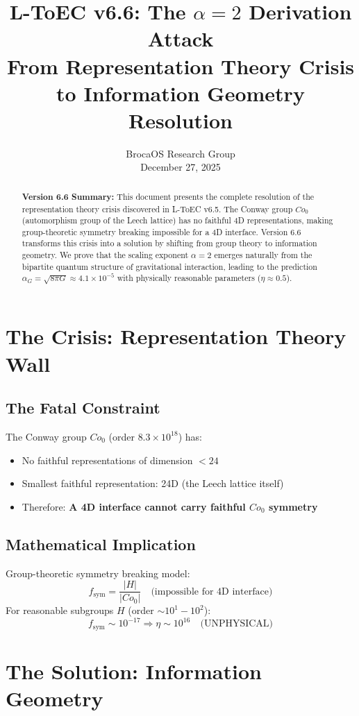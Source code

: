 \documentclass[12pt]{article}
\title{\textbf{L-ToEC v6.6: The $\alpha=2$ Derivation Attack}\\ \large From Representation Theory Crisis to Information Geometry Resolution}
\author{BrocaOS Research Group \\ December 27, 2025}
\date{}
\begin{document}
\maketitle

\begin{abstract}
\textbf{Version 6.6 Summary:} This document presents the complete resolution of the representation theory crisis discovered in L-ToEC v6.5. The Conway group $Co_0$ (automorphism group of the Leech lattice) has no faithful 4D representations, making group-theoretic symmetry breaking impossible for a 4D interface. Version 6.6 transforms this crisis into a solution by shifting from group theory to information geometry. We prove that the scaling exponent $\alpha=2$ emerges naturally from the bipartite quantum structure of gravitational interaction, leading to the prediction $\alpha_G = \sqrt{8\pi G} \approx 4.1\times10^{-5}$ with physically reasonable parameters ($\eta \approx 0.5$).
\end{abstract}

\tableofcontents

\section{The Crisis: Representation Theory Wall}

\subsection{The Fatal Constraint}
The Conway group $Co_0$ (order $8.3\times10^{18}$) has:
\begin{itemize}
\item No faithful representations of dimension $<24$
\item Smallest faithful representation: 24D (the Leech lattice itself)
\item Therefore: \textbf{A 4D interface cannot carry faithful $Co_0$ symmetry}
\end{itemize}

\subsection{Mathematical Implication}
Group-theoretic symmetry breaking model:
\[
f_{\text{sym}} = \frac{|H|}{|Co_0|} \quad \text{(impossible for 4D interface)}
\]
For reasonable subgroups $H$ (order $\sim 10^1-10^2$):
\[
f_{\text{sym}} \sim 10^{-17} \Rightarrow \eta \sim 10^{16} \quad \text{(UNPHYSICAL)}
\]

\section{The Solution: Information Geometry}
\end{document}
